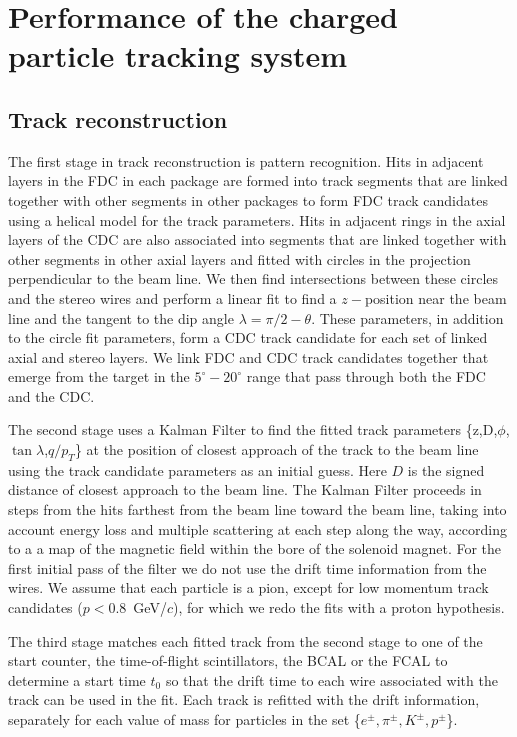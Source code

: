 \section[Performance of the charged particle tracking system (Simon)]{Performance of the charged particle tracking system \label{sec:trackingperformance}}
\subsection{Track reconstruction}

The first stage in track reconstruction is pattern recognition.  Hits in adjacent
 layers in the FDC in each package are formed into track segments that are 
linked together with other segments in other packages to form FDC track 
candidates using a helical model for the track parameters.
Hits in adjacent rings in the axial layers of the CDC are also associated into 
segments that are linked together with other segments in other axial layers
and fitted with circles in the projection perpendicular to the beam line. We 
then find intersections between these circles and the stereo wires and perform 
a linear fit to find a $z-$position near the beam line and the tangent to the dip
 angle $\lambda=\pi/2-\theta$.  These parameters, in addition to the circle fit 
parameters, form a CDC track candidate for each set of linked axial and stereo 
layers.   We link FDC and CDC track candidates together that emerge from the 
target in the $5^\circ-20^\circ$ range that pass through both the FDC 
and the CDC.

The second stage uses a Kalman Filter \cite{KalmanFilter, KalmanFilter2} to find the fitted track parameters
\{z,D,$\phi$,$\tan\lambda$,$q/p_T$\}
at the position of closest approach of the track to the beam line using the 
track candidate parameters as an initial guess.  Here $D$ is the signed 
distance of closest approach to the beam line.  The Kalman Filter proceeds in 
steps from
the hits farthest from the beam line toward the beam line, taking into account
energy loss and multiple scattering at each step along the way, according to a
a map of the magnetic field within the bore of the solenoid magnet.  For the 
first 
initial pass of the filter we do not use the drift time information from the 
wires.  We assume that each particle is a pion, except for low momentum track 
candidates ($p<0.8$~GeV/$c$), for which we redo the fits with a proton hypothesis.

The third stage matches each fitted track from the second 
stage to one of the start counter, the time-of-flight scintillators, the BCAL or the 
FCAL to determine a start time $t_0$ so that the drift time to each wire 
associated with the track can be used in the fit.  Each track is refitted with
the drift information, separately for each value of mass for particles in the set \{$e^\pm,\pi^\pm,K^\pm,p^\pm$\}.




